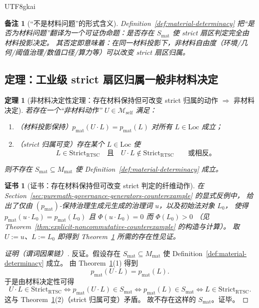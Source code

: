 \documentclass[12pt]{article}
\newtheorem{theorem}{定理}[section]
\newtheorem{remark}{备注}[section]
\newtheorem{certificate}{证书}[section]
\begin{document}
\begin{CJK*}{UTF8}{gkai}
\begin{remark}[“不是材料问题”的形式含义]
Definition~\ref{def:material-determinacy} 把“是否为材料问题”翻译为一个可证伪命题：是否存在 $S_{\mathrm{mat}}$ 使 strict 扇区判定完全由材料投影决定。
其否定即意味着：在同一材料投影下，非材料自由度（环境/几何/阈值治理/数值口径/算力等）可以改变 strict 扇区归属。
\end{remark}

\subsection{定理：工业级 strict 扇区归属一般非材料决定}

\begin{theorem}[非材料决定性定理：存在材料保持但可改变 strict 归属的动作 $\Rightarrow$ 非材料决定]
\label{thm:nonmaterial-determinacy}
若存在一个“非材料动作” $U\in\mathcal{M}_{\mathrm{self}}$ 满足：
\begin{enumerate}
  \item（材料投影保持）$p_{\mathrm{mat}}(U\cdot L)=p_{\mathrm{mat}}(L)$ 对所有 $L\in\mathrm{Loc}$ 成立；
  \item（strict 归属可变）存在某个 $L\in\mathrm{Loc}$ 使
  \[
  L\in \mathrm{Strict}_{\mathrm{RTSC}}
  \quad\text{且}\quad
  U\cdot L\notin \mathrm{Strict}_{\mathrm{RTSC}}
  \qquad\text{或相反。}
  \]
\end{enumerate}
则不存在 $S_{\mathrm{mat}}\subseteq M_{\mathrm{mat}}$ 使 Definition~\ref{def:material-determinacy} 成立。
\end{theorem}

\begin{certificate}[证书：存在材料保持但可改变 strict 判定的纤维动作]
\label{cert:nonmaterial-action-exists}
在 Section~\ref{sec:puremath-governance-generators-counterexample} 的显式反例中，
给出了仅由 $(p_{\mathrm{mat}})$-保持治理生成元生成的治理词 $u$，以及初始法对象 $L_0$，
使得 $p_{\mathrm{mat}}(u\cdot L_0)=p_{\mathrm{mat}}(L_0)$ 且 $\Phi(u\cdot L_0)=0$ 而 $\Phi(L_0)>0$
（见 Theorem~\ref{thm:explicit-noncommutative-counterexample} 的构造与计算）。
取 $U:=u$、$L:=L_0$ 即得到 Theorem~\ref{thm:nonmaterial-determinacy} 所需的存在性见证。
\end{certificate}

\begin{proof}[证明（谓词因果链）]
反证。假设存在 $S_{\mathrm{mat}}\subseteq M_{\mathrm{mat}}$ 使 Definition~\ref{def:material-determinacy} 成立。
由 Theorem~\ref{thm:nonmaterial-determinacy}(1) 得到
\[
p_{\mathrm{mat}}(U\cdot L)=p_{\mathrm{mat}}(L).
\]
于是由材料决定性可得
\[
U\cdot L\in \mathrm{Strict}_{\mathrm{RTSC}}
\Longleftrightarrow
p_{\mathrm{mat}}(U\cdot L)\in S_{\mathrm{mat}}
\Longleftrightarrow
p_{\mathrm{mat}}(L)\in S_{\mathrm{mat}}
\Longleftrightarrow
L\in \mathrm{Strict}_{\mathrm{RTSC}}.
\]
这与 Theorem~\ref{thm:nonmaterial-determinacy}(2)（strict 归属可变）矛盾。
故不存在这样的 $S_{\mathrm{mat}}$。证毕。
\end{proof}


\end{CJK*}
\end{document}
